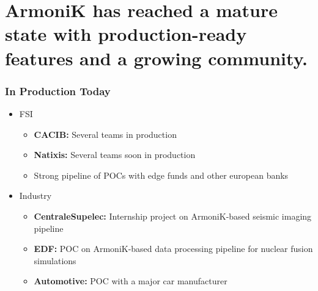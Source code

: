 
\section{ArmoniK has reached a mature state with production-ready features and a growing community.}

\begin{frame}
	\frametitle{In Production Today}
	\begin{itemize}
		\item FSI
		      \begin{itemize}
			      \item \textbf{CACIB:} Several teams in production
			      \item \textbf{Natixis:} Several teams soon in production
			      \item Strong pipeline of POCs with edge funds and other european banks
		      \end{itemize}
		\item Industry
		      \begin{itemize}
			      \item \textbf{CentraleSupelec:} Internship project on ArmoniK-based seismic imaging pipeline
			      \item \textbf{EDF:} POC on ArmoniK-based data processing pipeline for nuclear fusion simulations
			      \item \textbf{Automotive:} POC with a major car manufacturer
		      \end{itemize}
	\end{itemize}
\end{frame}

